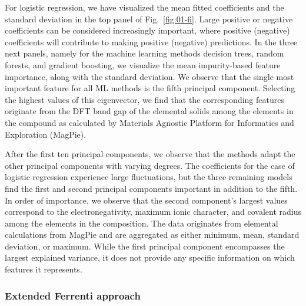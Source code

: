 \documentclass[superscriptaddress,unsortedaddress,
 amsmath,amssymb,
 aps,
]{revtex4-2}
\begin{document}
For logistic regression, we have visualized the mean fitted coefficients and the standard deviation in the top panel of Fig.~\ref{fig:01-fi}. Large positive or negative coefficients can be considered increasingly important, where positive (negative) coefficients will contribute to making positive (negative) predictions. In the three next panels, namely for the machine learning methods  decision trees, random forests, and gradient boosting, we visualize the mean impurity-based feature importance, along with the standard deviation. We observe that the single most important feature for all ML methods is the fifth principal component. Selecting the highest values of this eigenvector, we find that the corresponding features originate from the DFT band gap of the elemental solids among the elements in the compound as calculated by Materials Agnostic Platform for Informatics and Exploration (MagPie). 

After the first ten principal components, we observe that the methods adapt the other principal components with varying degrees. The coefficients for the case of logistic regression experience large fluctuations, but the three remaining models find the first and second principal components important in addition to the fifth. In order of importance, we observe that the second component's largest values correspond to the electronegativity, maximum ionic character, and covalent radius among the elements in the composition. The data originates from elemental calculations from MagPie and are aggregated as either minimum, mean, standard deviation, or maximum. While the first principal component encompasses the largest explained variance, it does not provide any specific information on which features it represents.



\subsubsection*{Extended Ferrenti approach}
\end{document}
